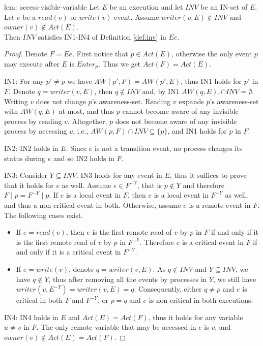 \begin{lemma-repeat} {lem: access-visible-variable}
	Let $E$ be an execution and let $\mathit{INV}$ be an IN-set of $E$. Let $e$ be a $read(v)$ or $write(v)$ event. Assume $writer(v,E) \notin \mathit{INV}$ and $owner(v) \notin Act(E)$.
	\\ Then $\mathit{INV}$ satisfies IN1-IN4 of Definition \ref{def:inv} in $E e$.\end{lemma-repeat}
\begin{proof}
	Denote $F = E e$. First notice that $p \in Act(E)$, otherwise the only event $p$ may execute after $E$ is $Enter_p$. Thus we get $Act(F) = Act(E)$.
	
	IN1: For any $p' \neq p$ we have $AW(p',F) = AW(p',E)$, thus IN1 holds for $p'$ in $F$. Denote $q = writer(v,E)$, then $q \notin INV$ and, by IN1 $AW(q,E), \cap INV = \emptyset$. Writing $v$ does not change $p$'s awareness-set. Reading $v$ expands $p$'s awareness-set with $AW(q,E)$ at most, and thus $p$ cannot become aware of any invisible process by reading $v$. Altogether, $p$ does not become aware of any invisible process by accessing $v$, i.e., $AW(p,F) \cap INV \subseteq \{p\}$, and IN1 holds for $p$ in $F$.
	
	IN2: IN2 holds in $E$. Since $e$ is not a transition event, no process changes its status during $e$ and so IN2 holds in $F$.
	
	IN3: Consider $Y \subseteq INV$. IN3 holds for any event in $E$, thus it suffices to prove that it holds for $e$ as well. Assume $e \in F^{-Y}$, that is $p \notin Y$ and therefore $F \mid p = F^{-Y} \mid p$. If $e$ is a local event in $F$, then $e$ is a local event in $F^{-Y}$ as well, and thus a non-critical event in both. Otherwise, assume $e$ is a remote event in $F$. The following cases exist.
\begin{itemize}
\item If $e = read(v)$, then $e$ is the first remote read of $v$ by $p$ in $F$ if and only if it is the first remote read of $v$ by $p$ in $F^{-Y}$. Therefore $e$ is a critical event in $F$ if and only if it is a critical event in $F^{-Y}$.
\item If $e = write(v)$, denote $q = writer(v,E)$. As $q \notin INV$ and $Y \subseteq INV$, we have $q \notin Y$, thus after removing all the events by processes in $Y$, we still have $writer(v,E^{-Y}) = writer(v,E) = q$. Consequently, either $q \neq p$ and $e$ is critical in both $F$ and $F^{-Y}$, or $p = q$ and $e$ is non-critical in both executions.
\end{itemize}
	
	IN4: IN4 holds in $E$ and $Act(E) = Act(F)$, thus it holds for any variable $u \neq v$ in $F$. The only remote variable that may be accessed in $e$ is $v$, and $owner(v) \notin Act(E) = Act(F)$.
\end{proof}

